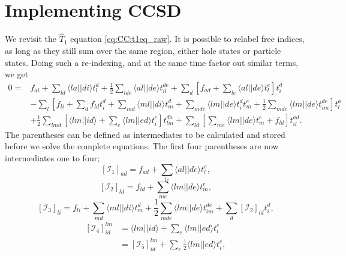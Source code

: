 \section{Implementing CCSD}
We revisit the $\hat{T}_1$ equation \eqref{eq:CC:t1eq_raw}.
It is possible to relabel free indices, as long as they still sum over the same region, either hole states or particle states.
Doing such a re-indexing, and at the same time factor out similar terms, we get
\begin{equation}
\begin{split}
0 =&
f_{ai}  + \sum_{ld} \langle la||di \rangle t_l^d  + \frac{1}{2} \sum_{lde} \langle al||de \rangle t_{il}^{de} 
+ \sum_d \left[ 
 f_{ad} + \sum_{le} \langle al||de \rangle t_l^e
\right]  t_i^d   
\\
%
&- \sum_l \left[
f_{li} +  \sum_{d} f_{ld} t_i^d  + \sum_{md} \langle ml||di \rangle t_m^d 
+ \sum_{mde} \langle lm||de \rangle t_i^d t_m^e 
+ \frac{1}{2} \sum_{mde} \langle lm||de \rangle t_{im}^{de}
\right] t_l^a \\
%
& + \frac{1}{2} \sum_{lmd} \left[
\langle lm||id \rangle + \sum_{e} \langle lm||ed \rangle t_i^e 
\right] t_{lm}^{da}
+
\sum_{ld} \left[
\sum_{me} \langle lm||de \rangle t_m^e + f_{ld}
\right] t_{il}^{ad} .
\end{split}
\end{equation}
The parentheses can be defined as intermediates to be calculated and stored before we solve the complete equations.
The first four parentheses are now intermediates one to four;
\begin{equation}
\left[ \mathcal{I}_1 \right]_{ad} =  f_{ad} + \sum_{le} \langle al||de \rangle t_l^e ,
\end{equation}
\begin{equation}
\left[ \mathcal{I}_2 \right]_{ld} = f_{ld} +  \sum_{me} \langle lm||de \rangle t_m^e  ,
\end{equation}
\begin{equation}
\left[ \mathcal{I}_3 \right]_{li} = 
f_{li}   + \sum_{md} \langle ml||di \rangle t_m^d 
+ \frac{1}{2} \sum_{mde} \langle lm||de \rangle t_{im}^{de}
+ \sum_d \left[\mathcal{I}_2 \right]_{ld} t_i^d ,
\end{equation}
\begin{equation}
\begin{split}
\left[ \mathcal{I}_4 \right]_{id}^{lm} &= \langle lm||id \rangle + \sum_e \langle lm||ed \rangle t_i^e \\
&= \left[\mathcal{I}_5 \right]_{id}^{lm} + \sum_e \frac{1}{2}\langle lm||ed \rangle t_i^e ,
\end{split}
\end{equation}
